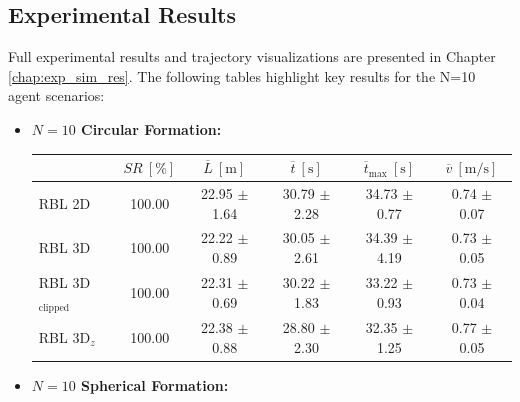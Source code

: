     \subsection{Experimental Results}
        Full experimental results and trajectory visualizations are presented in Chapter \ref{chap:exp_sim_res}. 
        The following tables highlight key results for the N=10 agent scenarios:
        \begin{itemize}
            \item \textbf{$N = 10$ Circular Formation:}
                \begin{table}[H]
                    \centering
                    \renewcommand{\arraystretch}{1.2}
                    \begin{tabular}{|l|c|c|c|c|c|}
                    \hline
                                                & \( SR \ [\%] \) & \( \overline{L} \ [\mathrm{m}] \) & \( \overline{t} \ [\mathrm{s}] \) & \( \overline{t}_{\text{max}} \ [\mathrm{s}] \) & \( \overline{v} \ [\mathrm{m/s}] \)     \\ \hline
                    RBL 2D                      & 100.00          & 22.95 $\pm$ 1.64                  & 30.79 $\pm$ 2.28                  & 34.73 $\pm$ 0.77                               & 0.74 $\pm$ 0.07                         \\ \hline
                    RBL 3D                      & 100.00          & 22.22 $\pm$ 0.89                  & 30.05 $\pm$ 2.61                  & 34.39 $\pm$ 4.19                               & 0.73 $\pm$ 0.05                         \\ \hline
                    RBL 3D\(_{\text{clipped}}\) & 100.00          & 22.31 $\pm$ 0.69                  & 30.22 $\pm$ 1.83                  & 33.22 $\pm$ 0.93                               & 0.73 $\pm$ 0.04                         \\ \hline
                    RBL 3D\(_z\)                & 100.00          & 22.38 $\pm$ 0.88                  & 28.80 $\pm$ 2.30                  & 32.35 $\pm$ 1.25                               & 0.77 $\pm$ 0.05                         \\ \hline
                    \end{tabular}
                \end{table}
            \item \textbf{$N = 10$ Spherical Formation:}
                \begin{table}[H]
                    \centering
                    \renewcommand{\arraystretch}{1.2}

\end{table}
\end{itemize}
